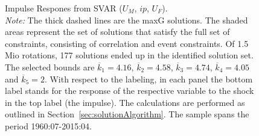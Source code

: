 \documentclass[a4paper,11pt,listof=nochaptergap,oneside,pointednumbers,bibtotoc,bigheadings,liststotoc,hidelinks]{scrbook}
\theoremstyle{mysatz}
\theoremstyle{mydefinition}
\theoremstyle{mytheorem}
\theoremstyle{mybemerkung}
\begin{document}
\begin{figure}[!h]
   \centering
   \setlength\fboxsep{0pt}
   \setlength\fboxrule{0pt}
      \caption[Impulse Respones from SVAR ($U_{M}$, $ip$, $U_{F}$).]{Impulse Respones from SVAR ($U_{M}$, $ip$, $U_{F}$).\\
      \textit{Note:}  The thick dashed lines are the maxG solutions. The shaded areas represent the set of solutions that satisfy the full set of constraints, consisting of correlation and event constraints. Of 1.5 Mio rotations, 177 solutions ended up in the identified solution set. The selected bounds are $\overline{k}_1 = 4.16$, $\overline{k}_2 = 4.58$, $\overline{k}_3 = 4.74$, $\overline{k}_4 = 4.05$ and $\overline{k}_5 = 2$. With respect to the labeling, in each panel the bottom label stands for the response of the respective variable to the shock in the top label (the impulse). The calculations are performed as outlined in Section~\ref{sec:solutionAlgorithm}. The sample spans the period 1960:07-2015:04.}   \label{fig:impulse.responses_all.SVAR}
\end{figure}
\end{document}
